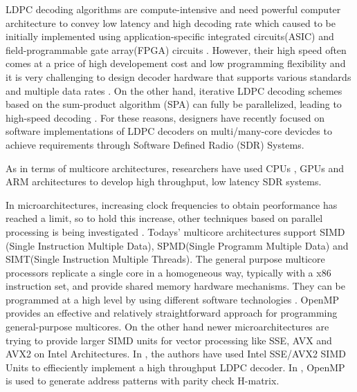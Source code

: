 \documentclass[conference]{IEEEtran}
\begin{document}
LDPC decoding algorithms are compute-intensive and need powerful computer architecture to convey low latency and high decoding rate which caused to be initially implemented using application-specific integrated circuits(ASIC) and field-programmable gate array(FPGA) circuits \cite{art_ldpc_OpenCl_1}. However, their high speed often comes at a price of high developement cost and low programming flexibility \cite{art_convolutional} and it is very challenging to design decoder hardware that supports various standards and multiple data rates \cite{art_cuda_openmp}. On the other hand, iterative LDPC decoding schemes based on the sum-product algorithm (SPA) can fully be parallelized, leading to high-speed decoding \cite{art_shannon}. For these reasons, designers have recently focused on software implementations of LDPC decoders on multi/many-core devicdes \cite{art_massively} to achieve requirements through Software Defined Radio (SDR) Systems.

As in terms of multicore architectures, researchers have used CPUs \cite{art_cpu_gpu, art_ldpc_cpu0}, GPUs \cite{art_memory_coalesced, art_massively, art_optimize_0}and ARM \cite{art_ldpc_cpu0, art_neon} architectures to develop high throughput, low latency SDR systems. 

In microarchitectures, increasing clock frequencies to obtain peorformance has reached a limit, so to hold this increase, other techniques based on parallel processing is being investigated \cite{art_ldpc_cpu1}. Todays' multicore architectures support SIMD (Single Instruction Multiple Data), SPMD(Single Programm Multiple Data) and SIMT(Single Instruction Multiple Threads). The general purpose multicore processors replicate a single core in a homogeneous way, typically with a x86 instruction set, and provide shared memory hardware mechanisms\cite{art_massively}. They can be programmed at a high level by using different software technologies \cite{art_multicore_techs}. OpenMP \cite{art_openMp_book} provides an effective and relatively straightforward approach for programming general-purpose multicores. On the other hand newer microarchitectures are trying to provide larger SIMD units for vector processing like SSE, AVX and AVX2 \cite{art_intel_sse} on Intel Architectures. In \cite{art_ldpc_cpu1}, the authors have used Intel SSE/AVX2 SIMD Units to effieciently implement a high throughput LDPC decoder. In \cite{art_cuda_openmp}, OpenMP is used to generate address patterns with parity check H-matrix.
\end{document}
